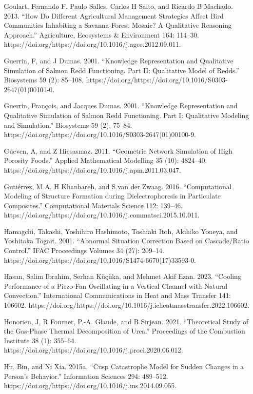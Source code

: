 \documentclass[utf8]{gradu3}
\begin{document}
Goulart, Fernando F, Paulo Salles, Carlos H Saito, and Ricardo B Machado. 2013. “How Do Different Agricultural Management Strategies Affect Bird Communities Inhabiting a Savanna-Forest Mosaic? A Qualitative Reasoning Approach.” Agriculture, Ecosystems \& Environment 164: 114–30. https://doi.org/https://doi.org/10.1016/j.agee.2012.09.011.

Guerrin, F, and J Dumas. 2001. “Knowledge Representation and Qualitative Simulation of Salmon Redd Functioning. Part II: Qualitative Model of Redds.” Biosystems 59 (2): 85–108. https://doi.org/https://doi.org/10.1016/S0303-2647(01)00101-0.

Guerrin, François, and Jacques Dumas. 2001. “Knowledge Representation and Qualitative Simulation of Salmon Redd Functioning. Part I: Qualitative Modeling and Simulation.” Biosystems 59 (2): 75–84. https://doi.org/https://doi.org/10.1016/S0303-2647(01)00100-9.

Gueven, A, and Z Hicsasmaz. 2011. “Geometric Network Simulation of High Porosity Foods.” Applied Mathematical Modelling 35 (10): 4824–40. https://doi.org/https://doi.org/10.1016/j.apm.2011.03.047.

Gutiérrez, M A, H Khanbareh, and S van der Zwaag. 2016. “Computational Modeling of Structure Formation during Dielectrophoresis in Particulate Composites.” Computational Materials Science 112: 139–46. https://doi.org/https://doi.org/10.1016/j.commatsci.2015.10.011.

Hamagchi, Takashi, Yoshihiro Hashimoto, Toshiaki Itoh, Akihiko Yoneya, and Yoshitaka Togari. 2001. “Abnormal Situation Correction Based on Cascade/Ratio Control.” IFAC Proceedings Volumes 34 (27): 209–14. https://doi.org/https://doi.org/10.1016/S1474-6670(17)33593-0.

Hasan, Salim Ibrahim, Serhan Küçüka, and Mehmet Akif Ezan. 2023. “Cooling Performance of a Piezo-Fan Oscillating in a Vertical Channel with Natural Convection.” International Communications in Heat and Mass Transfer 141: 106602. https://doi.org/https://doi.org/10.1016/j.icheatmasstransfer.2022.106602.

Honorien, J, R Fournet, P.-A. Glaude, and B Sirjean. 2021. “Theoretical Study of the Gas-Phase Thermal Decomposition of Urea.” Proceedings of the Combustion Institute 38 (1): 355–64. https://doi.org/https://doi.org/10.1016/j.proci.2020.06.012.

Hu, Bin, and Ni Xia. 2015a. “Cusp Catastrophe Model for Sudden Changes in a Person’s Behavior.” Information Sciences 294: 489–512. https://doi.org/https://doi.org/10.1016/j.ins.2014.09.055.
\end{document}
